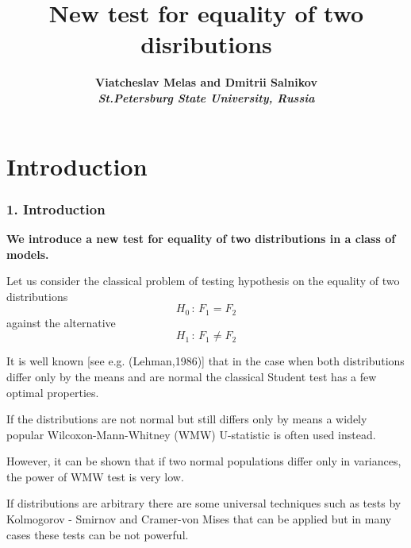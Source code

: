 \documentclass[slidestop,usepdftitle=false]{beamer}
\begin{document}
\title{New test for equality of two disributions}

\begin{slide}


\author{\bf { Viatcheslav Melas and Dmitrii Salnikov}\\
{\it{St.Petersburg State University, Russia}}}
\date{}


\maketitle

\end{slide}

\begin{slide}

\tableofcontents \setcounter{section}{0}
\setcounter{subsection}{0}
\end{slide}
\section{Introduction} \label{sec1}

\begin{slide}
\frametitle{ 1. Introduction}
{\bf We introduce a new test for equality of two distributions in a class of models.

\bigskip


Let us consider the classical problem of testing hypothesis on the equality of two distributions
\begin{equation}
  \label{H0}
  H_0\,:\,F_1 = F_2
\end{equation}
against the alternative
\begin{equation}
  \label{H1}
  H_1\,:\,F_1 \not= F_2
\end{equation}}






\end{slide}

\begin{slide}
\bigskip
It is well known [see e.g. (Lehman,1986)] that in the case when both distributions differ only by the means and are normal the classical Student test has a few optimal properties.
\bigskip


If the distributions are not normal but still differs only by means a widely popular Wilcoxon-Mann-Whitney (WMW) U-statistic is often used instead.
\bigskip

However, it can be shown that if two normal populations differ only in variances, the power of WMW test is very low.
\bigskip

If distributions are arbitrary there are some universal techniques such as tests by Kolmogorov - Smirnov and Cramer-von Mises   that can be applied but in many cases these tests can be not powerful.


\end{slide}
\end{document}
